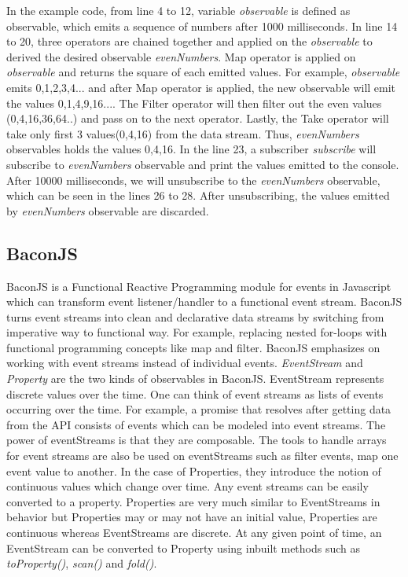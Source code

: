 In the example code, from line 4 to 12, variable \textit{observable} is defined as observable, which emits a sequence of numbers after 1000 milliseconds. In line 14 to 20, three operators are chained together and applied on the \textit{observable} to derived the desired observable \textit{evenNumbers}. Map operator is applied on \textit{observable} and returns the square of each emitted values. For example, \textit{observable} emits 0,1,2,3,4... and after Map operator is applied, the new observable will emit the values 0,1,4,9,16.... The Filter operator will then filter out the even values (0,4,16,36,64..) and pass on to the next operator. Lastly, the Take operator will take only first 3 values(0,4,16) from the data stream. Thus, \textit{evenNumbers} observables holds the values 0,4,16. In the line 23, a subscriber \textit{subscribe} will subscribe to \textit{evenNumbers} observable and print the values emitted to the console. After 10000 milliseconds, we will unsubscribe to the \textit{evenNumbers} observable, which can be seen in the lines 26 to 28. After unsubscribing, the values emitted by \textit{evenNumbers} observable are discarded.


\subsection{BaconJS}
BaconJS is a Functional Reactive Programming module for events in Javascript which can transform event listener/handler to a functional event stream. BaconJS turns event streams into clean and declarative data streams by switching from imperative way to functional way. For example, replacing nested for-loops with functional programming concepts like map and filter. BaconJS emphasizes on working with event streams instead of individual events. \textit{EventStream} and \textit{Property} are the two kinds of observables in BaconJS. EventStream represents discrete values over the time. One can think of event streams as lists of events occurring over the time. For example, a promise that resolves after getting data from the API consists of events which can be modeled into event streams. The power of eventStreams is that they are composable. The tools to handle arrays for event streams are also be used on eventStreams such as filter events, map one event value to another. In the case of Properties, they introduce the notion of continuous values which change over time. Any event streams can be easily converted to a property.  Properties are very much similar to EventStreams in behavior but Properties may or may not have an initial value, Properties are continuous whereas EventStreams are discrete. At any given point of time, an EventStream can be converted to Property using inbuilt methods such as \textit{toProperty()}, \textit{scan()} and \textit{fold()}\cite{baconBlog}. 


